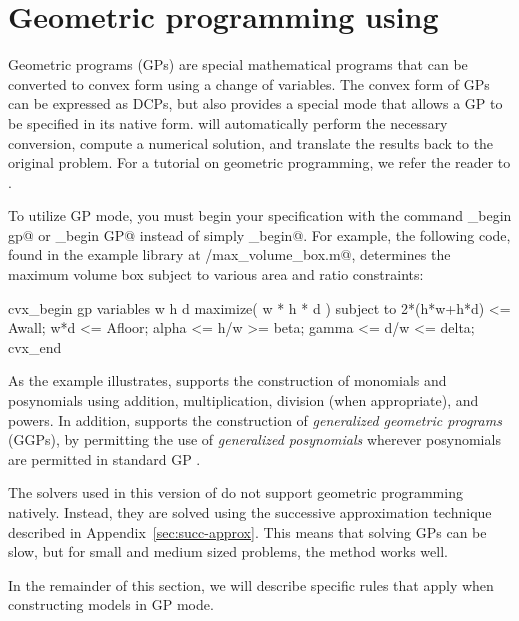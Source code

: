 \documentclass[12pt]{article}
\begin{document}
\newpage
\section{Geometric programming using \cvx}
\label{sec:gpmode}

Geometric programs (GPs) are special mathematical programs 
that can be converted to convex form using a change of variables.
The convex form of GPs can be expressed as DCPs, but \cvx also 
provides a special mode that allows a GP to be specified in 
its native form. \cvx will automatically perform the necessary
conversion, compute a numerical solution, and translate the results
back to the original problem.
For a tutorial on geometric programming,
we refer the reader to \cite{BKVH:05}.

To utilize GP mode, you must begin your \cvx specification
with the command \verb@cvx_begin gp@ or \verb@cvx_begin GP@ instead of simply
\verb@cvx_begin@. For example,
the following code, found in the example library at \verb@gp/max_volume_box.m@,
determines the maximum volume box subject to
various area and ratio constraints:
\begin{code}
	cvx_begin gp
	    variables w h d
	    maximize( w * h * d )
	    subject to
	        2*(h*w+h*d) <= Awall;
	        w*d <= Afloor;
	        alpha <= h/w >= beta;
	        gamma <= d/w <= delta;
	cvx_end
\end{code}
As the example illustrates, \cvx supports the construction of monomials and
posynomials using addition, multiplication, division (when appropriate),
and powers. In addition, \cvx supports the construction of \emph{generalized
geometric programs} (GGPs), by permitting the use of \emph{generalized
posynomials} wherever posynomials are permitted in standard GP \cite{BKVH:05}.

The solvers used in this version of \cvx do
not support geometric programming natively. Instead, they are solved using the
successive approximation technique described in
Appendix~\ref{sec:succ-approx}.  This means that solving GPs can be slow,
but for small and medium sized problems, the method works well.

In the remainder of this section, we will describe specific rules
that apply when constructing models in GP mode.
\end{document}
